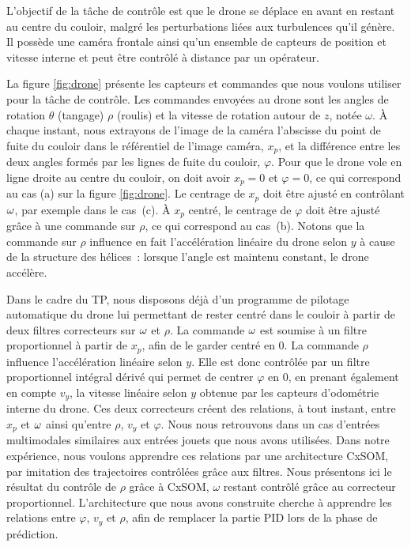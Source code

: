 \documentclass[../main]{subfiles}
\begin{document}
L'objectif de la tâche de contrôle est que le drone se déplace en avant en restant au centre du couloir, malgré les perturbations liées aux turbulences qu'il génère. Il possède une caméra frontale ainsi qu'un ensemble de capteurs de position et vitesse interne et peut être contrôlé à distance par un opérateur. 

La figure \ref{fig:drone} présente les capteurs et commandes que nous voulons utiliser pour la tâche de contrôle.
Les commandes envoyées au drone sont les angles de rotation $\theta$ (tangage) $\rho$ (roulis) et la vitesse de rotation autour de $z$, notée $\omega$. 
\`A chaque instant, nous extrayons de l'image de la caméra l'abscisse du point de fuite du couloir dans le référentiel de l'image caméra, $x_p$, et la différence entre les deux angles formés par les lignes de fuite du couloir, $\varphi$.
Pour que le drone vole en ligne droite au centre du couloir, on doit avoir $x_p = 0$ et $\varphi = 0$, ce qui correspond au cas (a) sur la figure \ref{fig:drone}.
Le centrage de $x_p$ doit être ajusté en contrôlant $\omega$, par exemple dans le cas~(c).
\`A $x_p$ centré, le centrage de $\varphi$ doit être ajusté grâce à une commande sur $\rho$, ce qui correspond au cas~(b). Notons que la commande sur $\rho$ influence en fait l'accélération linéaire du drone selon $y$ à cause de la structure des hélices~: lorsque l'angle est maintenu constant, le drone accélère.


Dans le cadre du TP, nous  disposons déjà d'un programme de pilotage automatique du drone lui permettant de rester centré dans le couloir à partir de deux filtres correcteurs sur $\omega$ et $\rho$.
La commande $\omega$ est soumise à un filtre proportionnel à partir de $x_p$, afin de le garder centré en 0.
La commande $\rho$ influence l'accélération linéaire selon $y$.
Elle est donc contrôlée par un filtre proportionnel intégral dérivé qui permet de centrer $\varphi$ en 0, en prenant également en compte $v_y$, la vitesse linéaire selon $y$ obtenue par les capteurs d'odométrie interne du drone.
Ces deux correcteurs créent des relations, à tout instant, entre $x_p$ et $\omega$ ainsi qu'entre $\rho$, $v_y$ et $\varphi$.
Nous nous retrouvons dans un cas d'entrées multimodales similaires aux entrées jouets que nous avons utilisées.
Dans notre expérience, nous voulons apprendre ces relations par une architecture CxSOM, par imitation des trajectoires contrôlées grâce aux filtres.
Nous présentons ici le résultat du contrôle de $\rho$ grâce à CxSOM, $\omega$ restant contrôlé grâce au correcteur proportionnel. L'architecture que nous avons construite cherche à apprendre les relations entre $\varphi$, $v_y$ et $\rho$, afin de remplacer la partie PID lors de la phase de prédiction. 
\end{document}
